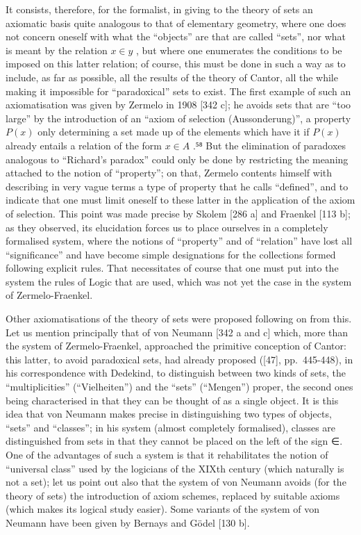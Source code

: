 It consists, therefore, for the formalist, in giving to the theory of sets an axiomatic basis quite analogous to that of elementary geometry, where one does not concern oneself with what the ``objects'' are that are called ``sets'', nor what is meant by the relation \(x \in y\) , but where one enumerates the conditions to be imposed on this latter relation; of course, this must be done in such a way as to include, as far as possible, all the results of the theory of Cantor, all the while making it impossible for ``paradoxical'' sets to exist. The first example of such an axiomatisation was given by Zermelo in 1908 {[}342 c{]}; he avoids sets that are ``too large'' by the introduction of an ``axiom of selection (Aussonderung)'', a property \(P(x)\) only determining a set made up of the elements which have it if \(P(x)\) already entails a relation of the form \(x \in A\) .⁵⁸ But the elimination of paradoxes analogous to ``Richard's paradox'' could only be done by restricting the meaning attached to the notion of ``property''; on that, Zermelo contents himself with describing in very vague terms a type of property that he calls ``defined'', and to indicate that one must limit oneself to these latter in the application of the axiom of selection. This point was made precise by Skolem {[}286 a{]} and Fraenkel {[}113 b{]}; as they observed, its elucidation forces us to place ourselves in a completely formalised system, where the notions of ``property'' and of ``relation'' have lost all ``significance'' and have become simple designations for the collections formed following explicit rules. That necessitates of course that one must put into the system the rules of Logic that are used, which was not yet the case in the system of Zermelo-Fraenkel.

Other axiomatisations of the theory of sets were proposed following on from this. Let us mention principally that of von Neumann {[}342 a and c{]} which, more than the system of Zermelo-Fraenkel, approached the primitive conception of Cantor: this latter, to avoid paradoxical sets, had already proposed ({[}47{]}, pp.~445-448), in his correspondence with Dedekind, to distinguish between two kinds of sets, the ``multiplicities'' (``Vielheiten'') and the ``sets'' (``Mengen'') proper, the second ones being characterised in that they can be thought of as a single object. It is this idea that von Neumann makes precise in distinguishing two types of objects, ``sets'' and ``classes''; in his system (almost completely formalised), classes are distinguished from sets in that they cannot be placed on the left of the sign ∈. One of the advantages of such a system is that it rehabilitates the notion of ``universal class'' used by the logicians of the XIXth century (which naturally is not a set); let us point out also that the system of von Neumann avoids (for the theory of sets) the introduction of axiom schemes, replaced by suitable axioms (which makes its logical study easier). Some variants of the system of von Neumann have been given by Bernays and Gödel {[}130 b{]}.

